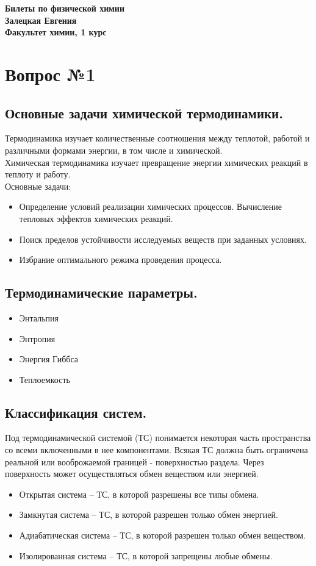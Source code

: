 \documentclass[14pt,a4paper]{scrartcl}
\begin{document}
	\begin{flushright}
	\textbf{Билеты по физической химии\\
		Залецкая Евгения \\
		Факультет химии, 1 курс}
\end{flushright}  	

\section*{Вопрос №1}

		\subsection*{Основные задачи химической термодинамики.} 
		Термодинамика изучает количественные соотношения между
		теплотой, работой и различными формами энергии, в том числе
		и химической. \\
		Химическая термодинамика изучает превращение энергии
		химических реакций в теплоту и работу. \\
		Основные задачи:
		\begin{itemize}
			\item Определение условий реализации химических процессов. Вычисление тепловых эффектов химических реакций.
			\item Поиск пределов устойчивости исследуемых веществ при заданных условиях.
			\item Избрание оптимального режима проведения процесса.	
		\end{itemize}
	
		\subsection*{Термодинамические параметры.} 
		\begin{itemize}
			\item Энтальпия
			\item Энтропия
			\item Энергия Гиббса
			\item Теплоемкость
		\end{itemize}
	
		\subsection*{Классификация систем.} 
		Под термодинамической системой (ТС) понимается некоторая часть пространства со всеми включенными в нее компонентами. Всякая ТС должна быть ограничена реальной или вооброжаемой границей - поверхностью раздела. Через поверхность может осуществляться обмен веществом или энергией.
		\begin{itemize}
			\item Открытая система -- ТС, в которой разрешены все типы обмена.
			\item Замкнутая система -- ТС, в которой разрешен только обмен энергией.
			\item Адиабатическая система -- ТС, в которой разрешен только обмен веществом.
			\item Изолированная система -- ТС, в которой запрещены любые обмены.
		\end{itemize}
	
\end{document}
